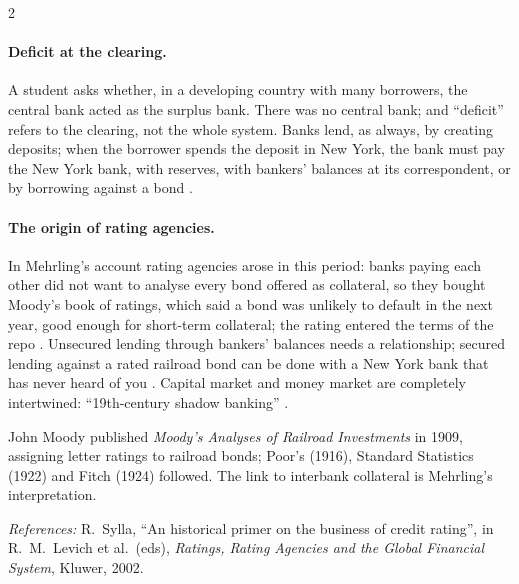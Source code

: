 \begin{paracol}{2}
\begin{nfigure}
\begin{taccts}
\qquad
{}
\end{taccts}
\caption{Interbank settlement in the US before the Fed .}\label{fig:di-us}
\end{nfigure}

\paragraph{Deficit at the clearing.} A student asks whether, in a developing country with many borrowers, the central bank acted as the surplus bank. There was no
central bank; and ``deficit'' refers to the clearing, not the whole system. Banks lend, as always, by creating deposits; when the borrower spends the deposit
in New York, the bank must pay the New York bank, with reserves, with bankers' balances at its correspondent, or by borrowing against a bond
.

\paragraph{The origin of rating agencies.} In Mehrling's account rating agencies arose in this period: banks paying each other did not want to analyse every bond
offered as collateral, so they bought Moody's book of ratings, which said a bond was unlikely to default in the next year, good enough for short-term collateral;
the rating entered the terms of the repo . Unsecured lending through bankers'
balances needs a relationship; secured lending against a rated railroad bond can be done with a New York bank that has never heard of you .
Capital market and money market are completely intertwined: ``19th-century shadow banking'' .

\begin{history}[Moody's, 1909]
John Moody published \emph{Moody's Analyses of Railroad Investments} in 1909, assigning letter ratings to railroad bonds; Poor's (1916), Standard Statistics
(1922) and Fitch (1924) followed. The link to interbank collateral is Mehrling's interpretation.\par
\emph{References:} R.~Sylla, ``An historical primer on the business of credit rating'', in R.~M.~Levich et al.\ (eds), \emph{Ratings, Rating Agencies and the
Global Financial System}, Kluwer, 2002.
\end{history}


\end{paracol}

